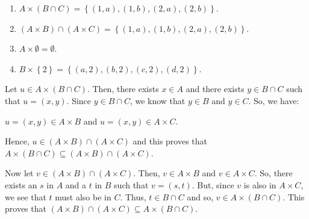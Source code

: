 \begin{list}{\bf{\ref{exer:sec44-1}.}}
\begin{enumerate}
\item $A \times \left( {B \cap C} \right) = \left\{ {\left( {1, a} \right), \left( {1, b} \right), \left( {2, a} \right), \left( {2, b} \right)} \right\}$.

\item $\left( A \times B \right) \cap \left( A \times C \right) = 
\left\{ {\left( {1, a} \right), \left( {1, b} \right), \left( {2, a} \right), \left( {2, b} \right)} \right\}$.

\item $A \times \emptyset = \emptyset$.

\item $B \times \left\{ 2 \right\} = \left\{ \left( a, 2 \right), \left( b, 2 \right), 
\left( c, 2 \right), \left( d, 2 \right) \right\}$.
\end{enumerate}

\end{list}

\begin{list}{\bf{\ref{exer:sec44-3}.}}
\item  Let $u \in A \times \left( {B \cap C} \right)$. Then, there exists $x \in A$ and there exists  $y \in B \cap C$ such that  $u = \left( {x, y} \right)$.  Since  $y \in B \cap C$, we know that  $y \in B$ and  $y \in C$.  So,  we have:
\begin{list}{}
\item $u = \left( x, y \right) \in A \times B$ and  $u = \left( x, y \right) \in A \times C$.
\end{list}
Hence, $u \in \left( A \times B \right) \cap \left( A \times C \right)$ and this proves that 
$A \times \left( {B \cap C} \right) \subseteq \left( A \times B \right) \cap \left( A \times C \right)$.

Now let $v \in \left( A \times B \right) \cap \left( A \times C \right)$.  Then, 
$v \in A \times B$ and $v \in A \times C$.  So, there exists an $s$ in $A$ and a $t$ in $B$ such that $v = \left( s, t \right)$.  But, since $v$ is also in $A \times C$, we see that $t$ must also be in $C$.  Thus, $t \in B \cap C$ and so, $v \in A \times \left( B \cap C \right)$.  This proves that $\left( A \times B \right) \cap \left( A \times C \right) \subseteq A \times \left( B \cap C \right)$.
\end{list}

